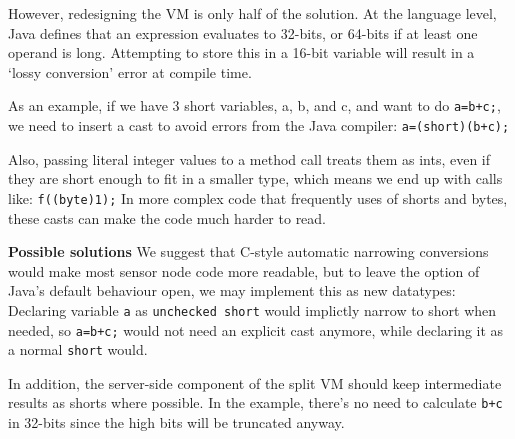 However, redesigning the VM is only half of the solution. At the language level, Java defines that an expression evaluates to 32-bits, or 64-bits if at least one operand is long. Attempting to store this in a 16-bit variable will result in a `lossy conversion' error at compile time.

As an example, if we have 3 short variables, a, b, and c, and want to do 
\texttt{a=b+c;}, we need to insert a cast to avoid errors from the Java compiler: \texttt{a=(short)(b+c);}

Also, passing literal integer values to a method call treats them as ints, even if they are short enough to fit in a smaller type, which means we end up with calls like: \texttt{f((byte)1);}
In more complex code that frequently uses of shorts and bytes, these casts can make the code much harder to read.




\textbf{Possible solutions}
We suggest that C-style automatic narrowing conversions would make most sensor node code more readable, but to leave the option of Java's default behaviour open, we may implement this as new datatypes: Declaring variable \texttt{a} as \texttt{unchecked short} would implictly narrow to short when needed, so \texttt{a=b+c;} would not need an explicit cast anymore, while declaring it as a normal \texttt{short} would.

In addition, the server-side component of the split VM should keep intermediate results as shorts where possible. In the example, there's no need to calculate \texttt{b+c} in 32-bits since the high bits will be truncated anyway.





